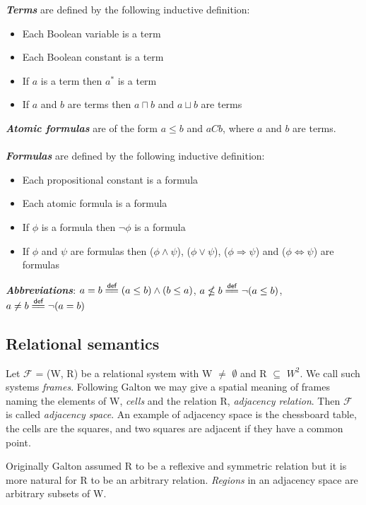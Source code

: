 \documentclass{article}
\newcommand\eqdef{\mathrel{\overset{\makebox[0pt]{\mbox{\normalfont\scriptsize\sffamily def}}}{=\joinrel=}}}
\newcommand\F{\mathcal{F}}
\begin{document}
	\noindent\textbf{\textit{Terms}} are defined by the following inductive definition:
	\begin{itemize}
		\item Each Boolean variable is a term
		\item Each Boolean constant is a term
		\item If $a$ is a term then $a^*$ is a term
		\item If $a$ and $b$ are terms then $a \sqcap b$ and $a \sqcup b$ are terms
	\end{itemize}

	\noindent\textbf{\textit{Atomic formulas}} are of the form $a \leq b$ and $aCb$, where $a$ and $b$ are terms.
\\
\\
	\noindent\textbf{\textit{Formulas}} are defined by the following inductive definition:
	\begin{itemize}
		\item Each propositional constant is a formula
		\item Each atomic formula is a formula
		\item If $\phi$ is a formula then $\neg\phi$ is a formula
		\item If $\phi$ and $\psi$ are formulas then ($\phi \land \psi$), ($\phi \lor \psi$), ($\phi \Rightarrow \psi$) and ($\phi \Leftrightarrow \psi$) are formulas
	\end{itemize}

	\noindent\textbf{\textit{Abbreviations}}:
		$a = b \eqdef (a \leq b) \land (b \leq a)$,
		$a \nleq b \eqdef \neg(a \leq b)$,
		$a \neq b \eqdef \neg(a = b)$

	\subsection{Relational semantics}
	\label{relational-system}

	\par
	Let $\F$ = (W, R) be a relational system with W $\neq$ $\emptyset$ and R $\subseteq$ $W^2$. We call such systems \textit{frames}. Following Galton we may give a spatial meaning of frames naming the elements of W, \textit{cells} and the relation R, \textit{adjacency relation}. Then $\F$ is called \textit{adjacency space}. An example of adjacency space is the chessboard table, the cells are the squares, and two squares are adjacent if they have a common point.

	\par
	Originally Galton assumed R to be a reflexive and symmetric relation but it is more natural for R to be an arbitrary relation. \textit{Regions} in an adjacency space are arbitrary subsets of W.
\end{document}
